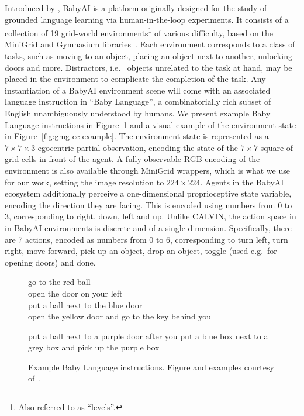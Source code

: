 \documentclass[../main.tex]{subfiles}
\begin{document}
Introduced by \citet{chevalier-boisvert_babyai_2022}, BabyAI is a platform originally designed for
the study of grounded language learning via human-in-the-loop experiments. It consists of
a collection of 19 grid-world environments\footnote{Also referred to as ``levels''.} of various
difficulty, based on the MiniGrid and Gymnasium libraries~\citep{chevalier-boisvert_minigrid_2023,
	towers_gymnasium_2023, brockman_openai_2016}. Each environment corresponds to a class of tasks, such
as moving to an object, placing an object next to another, unlocking doors and more. Distractors,
i.e.~ objects unrelated to the task at hand, may be placed in the environment to complicate the
completion of the task. Any instantiation of a BabyAI environment scene will come with an associated
language instruction in ``Baby Language'', a combinatorially rich subset of English unambiguously
understood by humans. We present example Baby Language instructions in Figure~\ref{fig:baby-lang}
and a visual example of the environment state in Figure~\ref{fig:gmg-cc-example}. The environment
state is represented as a $7 \times 7 \times 3$ egocentric partial observation, encoding the state
of the $7 \times 7$ square of grid cells in front of the agent. A fully-observable RGB encoding of
the environment is also available through MiniGrid wrappers, which is what we use for our work,
setting the image resolution to $224 \times 224$. Agents in the BabyAI ecosystem additionally
perceive a one-dimensional proprioceptive state variable, encoding the direction they are facing.
This is encoded using numbers from 0 to 3, corresponding to right, down, left and up. Unlike CALVIN,
the action space in in BabyAI environments is discrete and of a single dimension. Specifically,
there are 7 actions, encoded as numbers from 0 to 6, corresponding to turn left, turn right, move
forward, pick up an object, drop an object, toggle (used e.g.~for opening doors) and done.

\begin{figure}[t]
	\begin{center}
		go to the red ball
		\\
		\vspace{0.7em}
		open the door on your left
		\\
		\vspace{0.7em}
		put a ball next to the blue door
		\\
		\vspace{0.7em}
		open the yellow door and go to the key behind you
		\\
		\vspace{0.7em}
		\parbox[t]{10cm}{\centering put a ball next to a purple door after you put a blue box next to
			a grey box and pick up the purple box}
		\caption[Example Baby Language instructions.]{Example Baby Language instructions. Figure and
			examples courtesy of~\citet{chevalier-boisvert_babyai_2022}.}
		\label{fig:baby-lang}
	\end{center}
\end{figure}
\end{document}

